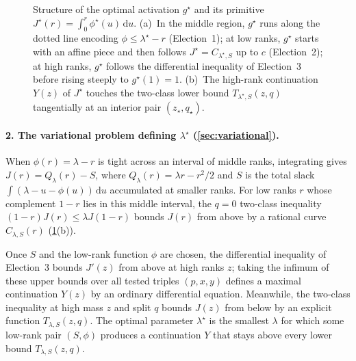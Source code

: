 \documentclass[11pt]{article}
\numberwithin{equation}{section}
\theoremstyle{plain}
\theoremstyle{definition}
\newcommand{\1}{\mathbf{1}}
\begin{document}
\begin{figure}[!t]
\caption{Structure of the optimal activation $g^\star$ and its primitive $J^\star(r) = \int_0^r \phi^\star(u)\,\mathrm{d}u$. (a)~In the middle region, $g^\star$ runs along the dotted line encoding $\phi \le \lambda^\star - r$ (Election~1); at low ranks, $g^\star$ starts with an affine piece and then follows $J^\star = C_{\lambda^\star,S}$ up to $c$ (Election~2); at high ranks, $g^\star$ follows the differential inequality of Election~3 before rising steeply to $g^\star(1) = 1$. (b)~The high-rank continuation $Y(z)$ of $J^\star$ touches the two-class lower bound $T_{\lambda^\star,S}(z, q)$ tangentially at an interior pair $(z_\star, q_\star)$.}
\label{fig:optimal-activation}
\end{figure}

\paragraph{2. The variational problem defining $\lambda^\star$ (\cref{sec:variational}).}
When $\phi(r) = \lambda - r$ is tight across an interval of middle ranks, integrating gives $J(r) = Q_\lambda(r) - S$, where $Q_\lambda(r) = \lambda r - r^2/2$ and $S$ is the total slack $\int (\lambda - u - \phi(u))\,\mathrm{d}u$ accumulated at smaller ranks. For low ranks $r$ whose complement $1 - r$ lies in this middle interval, the $q = 0$ two-class inequality $(1 - r)J(r) \le \lambda J(1 - r)$ bounds $J(r)$ from above by a rational curve $C_{\lambda, S}(r)$ (\cref{fig:optimal-activation}(b)).

Once $S$ and the low-rank function $\phi$ are chosen, the differential inequality of Election~3 bounds $J'(z)$ from above at high ranks $z$; taking the infimum of these upper bounds over all tested triples $(p, x, y)$ defines a maximal continuation $Y(z)$ by an ordinary differential equation. Meanwhile, the two-class inequality at high mass $z$ and split $q$ bounds $J(z)$ from below by an explicit function $T_{\lambda, S}(z, q)$. The optimal parameter $\lambda^\star$ is the smallest $\lambda$ for which some low-rank pair $(S, \phi)$ produces a continuation $Y$ that stays above every lower bound $T_{\lambda, S}(z, q)$.
\end{document}
